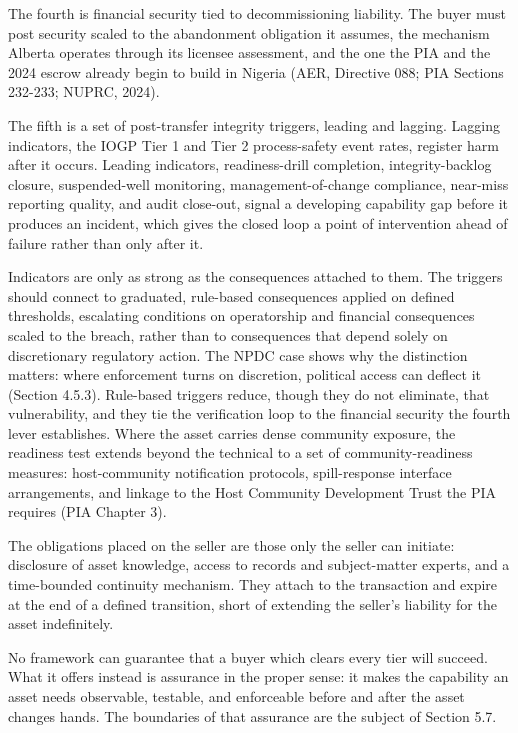 \documentclass[twoside,fontset=lmodern]{mitthesis}
\begin{document}
The fourth is financial security tied to decommissioning liability. The
buyer must post security scaled to the abandonment obligation it
assumes, the mechanism Alberta operates through its licensee assessment,
and the one the PIA and the 2024 escrow already begin to build in
Nigeria (AER, Directive 088; PIA Sections 232-233; NUPRC, 2024).

The fifth is a set of post-transfer integrity triggers, leading and
lagging. Lagging indicators, the IOGP Tier 1 and Tier 2 process-safety
event rates, register harm after it occurs. Leading indicators,
readiness-drill completion, integrity-backlog closure, suspended-well
monitoring, management-of-change compliance, near-miss reporting
quality, and audit close-out, signal a developing capability gap before
it produces an incident, which gives the closed loop a point of
intervention ahead of failure rather than only after it.

Indicators are only as strong as the consequences attached to them. The
triggers should connect to graduated, rule-based consequences applied on
defined thresholds, escalating conditions on operatorship and financial
consequences scaled to the breach, rather than to consequences that
depend solely on discretionary regulatory action. The NPDC case shows
why the distinction matters: where enforcement turns on discretion,
political access can deflect it (Section 4.5.3). Rule-based triggers
reduce, though they do not eliminate, that vulnerability, and they tie
the verification loop to the financial security the fourth lever
establishes. Where the asset carries dense community exposure, the
readiness test extends beyond the technical to a set of
community-readiness measures: host-community notification protocols,
spill-response interface arrangements, and linkage to the Host Community
Development Trust the PIA requires (PIA Chapter 3).

The obligations placed on the seller are those only the seller can
initiate: disclosure of asset knowledge, access to records and
subject-matter experts, and a time-bounded continuity mechanism. They
attach to the transaction and expire at the end of a defined transition,
short of extending the seller's liability for the asset indefinitely.

No framework can guarantee that a buyer which clears every tier will
succeed. What it offers instead is assurance in the proper sense: it
makes the capability an asset needs observable, testable, and
enforceable before and after the asset changes hands. The boundaries of
that assurance are the subject of Section 5.7.
\end{document}
